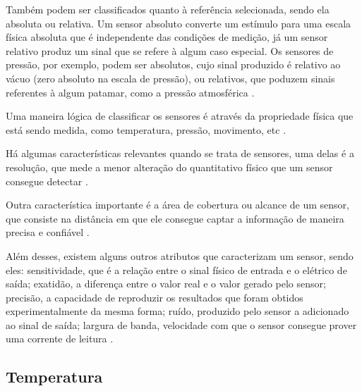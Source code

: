 Também podem ser classificados quanto à referência selecionada, sendo ela absoluta ou relativa. Um sensor
absoluto converte um estímulo para uma escala física absoluta que é independente das condições de medição, já
um sensor relativo produz um sinal que se refere à algum caso especial. Os sensores de pressão, por exemplo,
podem ser absolutos, cujo sinal produzido é relativo ao vácuo (zero absoluto na escala de pressão), ou
relativos, que poduzem sinais referentes à algum patamar, como a pressão atmosférica \cite{fraden2014}.

Uma maneira lógica de classificar os sensores é através da propriedade física que está sendo medida, como
temperatura, pressão, movimento, etc \cite{kenny_walt2005}.

Há algumas características relevantes quando se trata de sensores, uma delas é a resolução, que mede a
menor alteração do quantitativo físico que um sensor consegue detectar \cite{sinclair2001}.

Outra característica importante é a área de cobertura ou alcance de um sensor, que consiste na distância em
que ele consegue captar a informação de maneira precisa e confiável \cite{karl_willig2005}.

Além desses, existem alguns outros atributos que caracterizam um sensor, sendo eles: sensitividade, que é a
relação entre o sinal físico de entrada e o elétrico de saída; exatidão, a diferença entre o valor real e o
valor gerado pelo sensor; precisão, a capacidade de reproduzir os resultados que foram obtidos
experimentalmente da mesma forma; ruído, produzido pelo sensor a adicionado ao sinal de saída; largura de
banda, velocidade com que o sensor consegue prover uma corrente de leitura \cite{kenny_walt2005,kondrasovas2013}.

\subsection{Temperatura}

